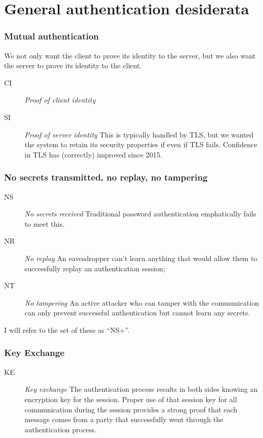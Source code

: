 \documentclass[xcolor={dvipsnames,table,hyperref}]{beamer}
\newcommand{\propdescription}[1]{\textit{#1}\hspace*{\fill}\linebreak }
\begin{document}
\section{General authentication desiderata}

\begin{frame}
  \frametitle{Mutual authentication}
  We not only want the client to prove its identity to the server, but we also
  want the server to prove its identity to the client.

  \begin{description}
    \item[CI] \propdescription{Proof of client identity}
    \item[SI] \propdescription{Proof of server identity}
      This is typically handled by TLS, but we wanted the system to retain its security properties if even if TLS fails. Confidence in TLS has (correctly) improved since 2015.
  \end{description}
\end{frame}

\begin{frame}
  \frametitle{No secrets transmitted, no replay, no tampering}
  \begin{description}
    \item[NS] \propdescription{No secrets received}
      Traditional password authentication emphatically fails to meet this.
    \item[NR] \propdescription{No replay}
      An eavesdropper can't learn anything that would allow them to successfully replay an authentication session;
    \item[NT] \propdescription{No tampering}
      An active attacker who can tamper with the communication can only prevent successful authentication but cannot learn any secrets.
  \end{description}

  I will refer to the set of these as “NS+”.
\end{frame}

\begin{frame}
  \frametitle{Key Exchange}
  \begin{description}
    \item[KE] \propdescription{Key exchange}
      The authentication process results in both sides knowing an encryption key for the session. Proper use of that session key for all communication during the session provides a strong proof that each message comes from a party that successfully went through the authentication process.
  \end{description}
\end{frame}
\end{document}
